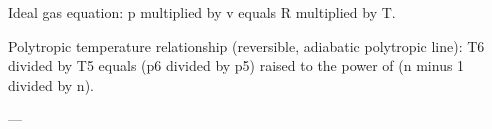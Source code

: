 Ideal gas equation:  
p multiplied by v equals R multiplied by T.  

Polytropic temperature relationship (reversible, adiabatic polytropic line):  
T6 divided by T5 equals (p6 divided by p5) raised to the power of (n minus 1 divided by n).

---